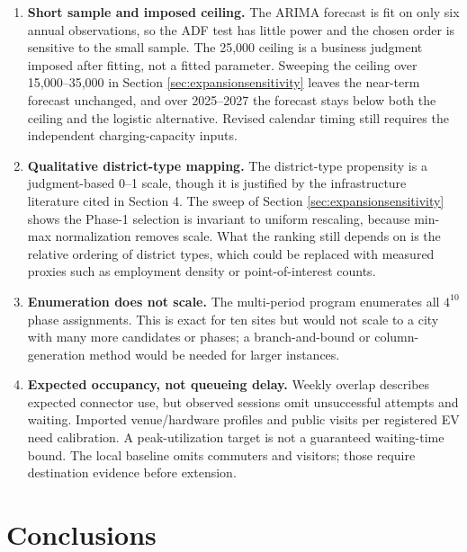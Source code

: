 \documentclass[12pt]{article}
\begin{document}
\begin{enumerate}
    \item \textbf{Short sample and imposed ceiling.} The ARIMA forecast is fit on only six
    annual observations, so the ADF test has little power and the chosen order is sensitive
    to the small sample. The 25,000 ceiling is a business judgment imposed after fitting,
    not a fitted parameter. Sweeping the ceiling over 15,000--35,000 in Section \ref{sec:expansionsensitivity} leaves
    the near-term forecast unchanged, and over 2025--2027 the forecast stays below both the
    ceiling and the logistic alternative. Revised calendar timing still requires the
    independent charging-capacity inputs.
    \item \textbf{Qualitative district-type mapping.} The district-type propensity is a
    judgment-based 0--1 scale, though it is justified by the infrastructure literature cited
    in Section 4. The sweep of Section \ref{sec:expansionsensitivity} shows the Phase-1 selection is invariant to
    uniform rescaling, because min-max normalization removes scale. What the ranking still
    depends on is the relative ordering of district types, which could be replaced with
    measured proxies such as employment density or point-of-interest counts.
    \item \textbf{Enumeration does not scale.} The multi-period program enumerates all
    $4^{10}$ phase assignments. This is exact for ten sites but would not scale to a city
    with many more candidates or phases; a branch-and-bound or column-generation method
    would be needed for larger instances.
    \item \textbf{Expected occupancy, not queueing delay.} Weekly overlap describes
    expected connector use, but observed sessions omit unsuccessful attempts and waiting.
    Imported venue/hardware profiles and public visits per registered EV need calibration.
    A peak-utilization target is not a guaranteed waiting-time bound. The local baseline
    omits commuters and visitors; those require destination evidence before extension.
\end{enumerate}

\section{Conclusions}
\end{document}
